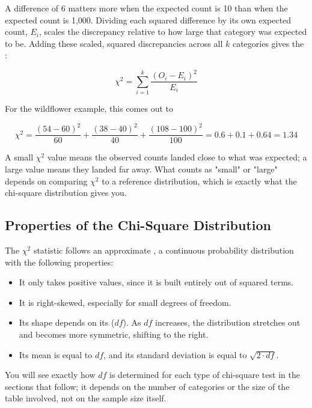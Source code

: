 A difference of 6 matters more when the expected count is 10 than when the expected count is 1{,}000. Dividing each squared difference by its own expected count, $E_i$, scales the discrepancy relative to how large that category was expected to be. Adding these scaled, squared discrepancies across all $k$ categories gives the :

\[
\chi^2 = \sum_{i=1}^{k} \frac{(O_i - E_i)^2}{E_i}
\]

For the wildflower example, this comes out to

\[
\chi^2 = \frac{(54-60)^2}{60} + \frac{(38-40)^2}{40} + \frac{(108-100)^2}{100} = 0.6 + 0.1 + 0.64 = 1.34
\]

A small $\chi^2$ value means the observed counts landed close to what was expected; a large value means they landed far away. What counts as "small" or "large" depends on comparing $\chi^2$ to a reference distribution, which is exactly what the chi-square distribution gives you.

\subsection{Properties of the Chi-Square Distribution}

The $\chi^2$ statistic follows an approximate , a continuous probability distribution with the following properties:

\begin{itemize}
    \item It only takes positive values, since it is built entirely out of squared terms.
    \item It is right-skewed, especially for small degrees of freedom.
    \item Its shape depends on its  ($df$). As $df$ increases, the distribution stretches out and becomes more symmetric, shifting to the right.
    \item Its mean is equal to $df$, and its standard deviation is equal to $\sqrt{2 \cdot df}$.
\end{itemize}


You will see exactly how $df$ is determined for each type of chi-square test in the sections that follow; it depends on the number of categories or the size of the table involved, not on the sample size itself.

